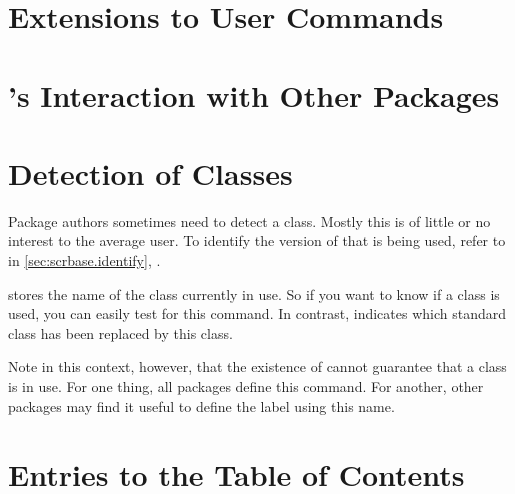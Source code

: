 
\section{Extensions to User Commands}



\section{\KOMAScript's Interaction with Other Packages}



\section{Detection of \KOMAScript{} Classes}

Package authors sometimes need to detect a \KOMAScript{} class. Mostly this is
of little or no interest to the average user. To identify the version of
\KOMAScript{} that is being used, refer to
 in \autoref{sec:scrbase.identify},
.

\begin{Declaration}
\end{Declaration}
 stores the name of the \KOMAScript{} class currently in
use. So if you want to know if a \KOMAScript{} class is used, you can easily
test for this command. In contrast,  indicates which standard
class has been replaced by this \KOMAScript{} class.

Note in this context, however, that the existence of
 cannot guarantee that a
\KOMAScript{} class is in use. For one thing, all \KOMAScript{} packages
define this command. For another, other packages may find it useful to define
the \KOMAScript{} label using this name.%
%
\EndIndexGroup

\section{Entries to the Table of Contents}

